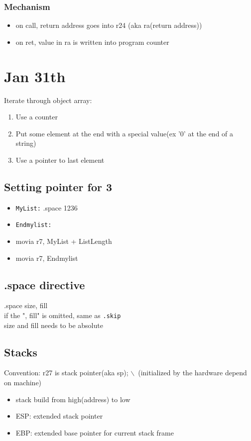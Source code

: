 \documentclass[11pt]{article}
\begin{document}
\subsubsection{Mechanism}
\label{sec:orgheadline34}
\begin{itemize}
\item on call, return address goes into r24 (aka ra(return address))
\item on ret, value in ra is written into program counter
\end{itemize}
\section{Jan 31th}
\label{sec:orgheadline40}
Iterate through object array:
\begin{enumerate}
\item Use a counter
\item Put some element at the end with a special value(ex '0' at the end of a string)
\item Use a pointer to last element
\end{enumerate}
\subsection{Setting pointer for 3}
\label{sec:orgheadline37}
\begin{itemize}
\item \texttt{MyList:} .space 1236
\item \texttt{Endmylist:}
\item movia r7, MyList + ListLength
\item movia r7, Endmylist
\end{itemize}
\subsection{.space directive}
\label{sec:orgheadline38}
.space size, fill \\
if the ", fill" is omitted, same as \texttt{.skip} \\
size and fill needs to be absolute
\subsection{Stacks}
\label{sec:orgheadline39}
Convention: r27 is stack pointer(aka sp); $\backslash$\ (initialized by the hardware depend on machine)
\begin{itemize}
\item stack build from high(address) to low
\item ESP: extended stack pointer
\item EBP: extended base pointer for current stack frame
\end{itemize}
\end{document}
